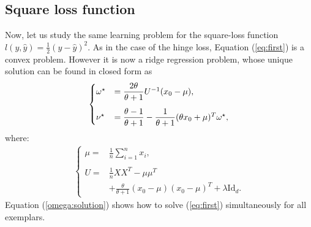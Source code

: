 \subsection{Square loss function}\label{slem:intro}
Now, let us study the same learning problem for the square-loss function $l(y,\hat{y}) = \frac{1}{2}(y-\hat{y})^2$. As in the case of the hinge loss, Equation (\ref{eq:first}) is a convex problem. 
However it is now a ridge regression problem, whose unique solution can be found in closed form as
\begin{align}
\begin{cases}
\vspace{3 mm}
\omega^\star &= \dfrac{2\theta}{\theta+1}U^{-1}(x_0-\mu), \\
\nu^\star &= \dfrac{\theta-1}{\theta+1}-\dfrac{1}{\theta+1}(\theta x_0+\mu)^T\omega^\star,
\end{cases}
\label{omega:solution}
\end{align}
where:
\begin{align}
\begin{cases}
\mu = &\frac{1}{n}\sum_{i=1}^n x_i,\\ \\
U = &\frac{1}{n}XX^T-\mu\mu^T\\
&+\frac{\theta}{\theta+1}(x_0-\mu)(x_0-\mu)^T+\lambda\mathrm{Id}_d. \label{eq:U}
\end{cases}
\end{align}
Equation (\ref{omega:solution}) shows how to solve (\ref{eq:first}) simultaneously for all exemplars.

